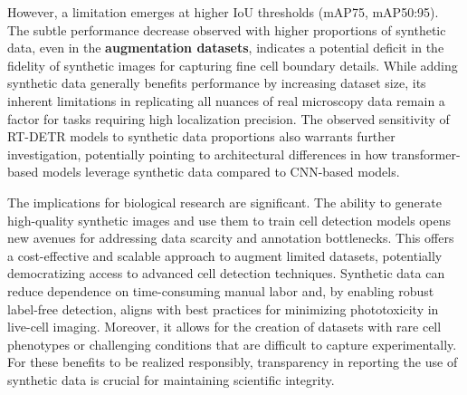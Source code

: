 However, a limitation emerges at higher IoU thresholds (mAP\@75, mAP\@50:95).
The subtle performance decrease observed with higher proportions of synthetic data, even in the \textbf{augmentation datasets}, indicates a potential deficit in the fidelity of synthetic images for capturing fine cell boundary details.
While adding synthetic data generally benefits performance by increasing dataset size, its inherent limitations in replicating all nuances of real microscopy data remain a factor for tasks requiring high localization precision.
The observed sensitivity of RT-DETR models to synthetic data proportions also warrants further investigation, potentially pointing to architectural differences in how transformer-based models leverage synthetic data compared to CNN-based models.

The implications for biological research are significant.
The ability to generate high-quality synthetic images and use them to train cell detection models opens new avenues for addressing data scarcity and annotation bottlenecks.
This offers a cost-effective and scalable approach to augment limited datasets, potentially democratizing access to advanced cell detection techniques.
Synthetic data can reduce dependence on time-consuming manual labor and, by enabling robust label-free detection, aligns with best practices for minimizing phototoxicity in live-cell imaging.
Moreover, it allows for the creation of datasets with rare cell phenotypes or challenging conditions that are difficult to capture experimentally.
For these benefits to be realized responsibly, transparency in reporting the use of synthetic data is crucial for maintaining scientific integrity.
